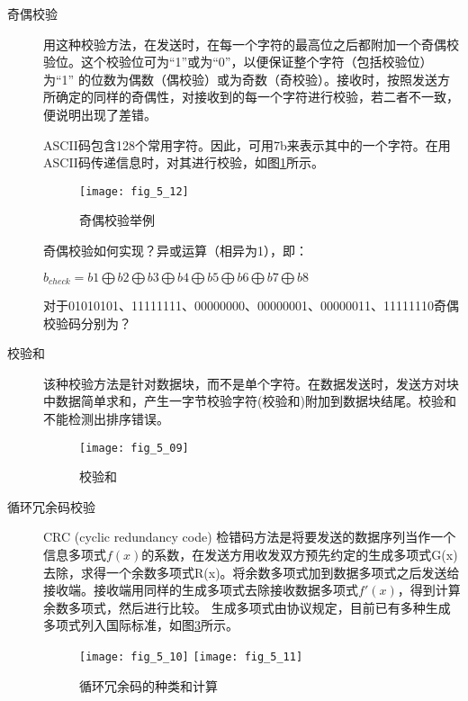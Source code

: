 \begin{description}
  \item[奇偶校验] 用这种校验方法，在发送时，在每一个字符的最高位之后都附加一个奇偶校验位。这个校验位可为“1”或为“0”，以便保证整个字符（包括校验位）为“1” 的位数为偶数（偶校验）或为奇数（奇校验）。接收时，按照发送方所确定的同样的奇偶性，对接收到的每一个字符进行校验，若二者不一致，便说明出现了差错。

      \begin{remark}
        ASCII码包含128个常用字符。因此，可用7b来表示其中的一个字符。在用ASCII码传递信息时，对其进行校验，如图\ref{fig_5_12}所示。

      \end{remark}
\begin{figure}
  \centering
  \texttt{[image: fig\_5\_12]}\\
  \caption{奇偶校验举例}\label{fig_5_12}
\end{figure}

\begin{remark}
  奇偶校验如何实现？异或运算（相异为1），即：

  $b_{check} = b1\bigoplus b2 \bigoplus b3 \bigoplus b4 \bigoplus b5 \bigoplus b6 \bigoplus b7 \bigoplus b8$

  对于01010101、11111111、00000000、00000001、00000011、11111110奇偶校验码分别为？
\end{remark}

  \item[校验和] 该种校验方法是针对数据块，而不是单个字符。在数据发送时，发送方对块中数据简单求和，产生一字节校验字符(校验和)附加到数据块结尾。校验和不能检测出排序错误。
\begin{figure}
  \centering
  \texttt{[image: fig\_5\_09]}\\
  \caption{校验和}\label{fig_5_09}
\end{figure}
  \item[循环冗余码校验] CRC (cyclic redundancy code) 检错码方法是将要发送的数据序列当作一个信息多项式$f(x)$的系数，在发送方用收发双方预先约定的生成多项式G(x)去除，求得一个余数多项式R(x)。将余数多项式加到数据多项式之后发送给接收端。接收端用同样的生成多项式去除接收数据多项式$f'(x)$，得到计算余数多项式，然后进行比较。
  生成多项式由协议规定，目前已有多种生成多项式列入国际标准，如图\ref{fig_5_11}所示。

\begin{figure}
  \texttt{[image: fig\_5\_10]}
  \texttt{[image: fig\_5\_11]}\\
  \caption{循环冗余码的种类和计算}\label{fig_5_11}
\end{figure}


\end{description}
